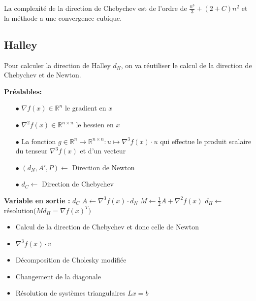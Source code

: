 La complexit\'e de la direction de Chebychev est de l'ordre de $\frac{n^3}{3}+(2+C)n^2$ et la m\'ethode a une convergence cubique.




\subsection{Halley}

Pour calculer la direction de Halley $d_H$, on va r\'eutiliser le calcul
de la direction de Chebychev et de Newton. %

\begin{algorithm}                     %
\caption{Direction de Halley}          %
\label{alg:4}                           %
\begin{algorithmic}
\STATE \textbf{Pr\'ealables:} %
\begin{itemize}
\item[$\bullet$] $\nabla f(x)\in \mathbb{R}^n$ le gradient en $x$
\item[$\bullet$] $\nabla^2 f(x)\in \mathbb{R}^{n\times n}$ le hessien en $x$
\item[$\bullet$] La fonction $g\in \mathbb{R}^{n} \rightarrow \mathbb{R}^{n\times n} : u \mapsto \nabla^3 f(x)\cdot u$ qui effectue
 le produit scalaire du tenseur $\nabla^3 f(x)$ et d'un vecteur
\item[$\bullet$] $(d_N,A',P)\leftarrow$ Direction de Newton
\item[$\bullet$] $d_C\leftarrow$ Direction de Chebychev

\end{itemize}

\STATE \textbf{Variable en sortie :} $d_C$
\STATE $A \leftarrow \nabla^3 f(x) \cdot d_N$
\STATE $M \leftarrow \frac{1}{2}A+\nabla^2 f(x)$
\STATE $d_H \leftarrow$ r\'esolution($Md_H=\nabla f(x)^T)$
\end{algorithmic}
\end{algorithm}



\begin{itemize}
\item Calcul de la direction de Chebychev et donc celle de Newton
\item $\nabla^3 f(x)\cdot v$
\item D\'ecomposition de Cholesky modifi\'ee
\item Changement de la diagonale
\item R\'esolution de syst\`emes triangulaires $Lx=b$
\end{itemize}



